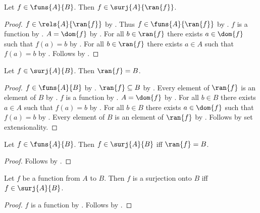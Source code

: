 \begin{lemma}\label{fun_to_surj}
    Let $f\in\funs{A}{B}$.
    Then $f\in\surj{A}{\ran{f}}$.
\end{lemma}
\begin{proof}
    $f\in\rels{A}{\ran{f}}$ by .
    Thus $f\in\funs{A}{\ran{f}}$ by .
    $f$ is a function by .
    $A = \dom{f}$ by .
    For all $b\in\ran{f}$ there exists $a\in\dom{f}$ such that $f(a) = b$
        by .
    For all $b\in\ran{f}$ there exists $a\in A$ such that $f(a) = b$
        by \auto.
    Follows by .
\end{proof}

\begin{corollary}\label{ran_of_surj}
    Let $f\in\surj{A}{B}$.
    Then $\ran{f} = B$.
\end{corollary}
\begin{proof}
    $f\in\funs{A}{B}$ by .
    $\ran{f}\subseteq B$ by .
    Every element of $\ran{f}$ is an element of $B$
        by .
    $f$ is a function by .
    $A = \dom{f}$ by .
    For all $b\in B$ there exists $a\in A$ such that $f(a) = b$
        by .
    For all $b\in B$ there exists $a\in\dom{f}$ such that $f(a) = b$
        by \auto.
    Every element of $B$ is an element of $\ran{f}$
        by .
    Follows by set extensionality.
\end{proof}

\begin{corollary}\label{funs_surj_iff}
    Let $f\in\funs{A}{B}$.
    Then $f\in\surj{A}{B}$ iff $\ran{f} = B$.
\end{corollary}
\begin{proof}
    Follows by .
\end{proof}

\begin{corollary}\label{surjection_onto_iff_surj}
    Let $f$ be a function from $A$ to $B$.
    Then $f$ is a surjection onto $B$ iff $f\in\surj{A}{B}$.
\end{corollary}
\begin{proof}
    $f$ is a function by .
    Follows by .
\end{proof}

